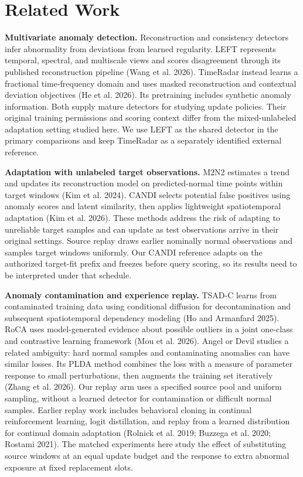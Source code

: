 \documentclass[
  american,
]{article}
\begin{document}
\section{Related Work}\label{related-work}

\textbf{Multivariate anomaly detection.} Reconstruction and consistency
detectors infer abnormality from deviations from learned regularity.
LEFT represents temporal, spectral, and multiscale views and scores
disagreement through its published reconstruction pipeline (Wang et al.
2026). TimeRadar instead learns a fractional time-frequency domain and
uses masked reconstruction and contextual deviation objectives (He et
al. 2026). Its pretraining includes synthetic anomaly information. Both
supply mature detectors for studying update policies. Their original
training permissions and scoring context differ from the mixed-unlabeled
adaptation setting studied here. We use LEFT as the shared detector in
the primary comparisons and keep TimeRadar as a separately identified
external reference.

\textbf{Adaptation with unlabeled target observations.} M2N2 estimates a
trend and updates its reconstruction model on predicted-normal time
points within target windows (Kim et al. 2024). CANDI selects potential
false positives using anomaly scores and latent similarity, then applies
lightweight spatiotemporal adaptation (Kim et al. 2026). These methods
address the risk of adapting to unreliable target samples and can update
as test observations arrive in their original settings. Source replay
draws earlier nominally normal observations and samples target windows
uniformly. Our CANDI reference adapts on the authorized target-fit
prefix and freezes before query scoring, so its results need to be
interpreted under that schedule.

\textbf{Anomaly contamination and experience replay.} TSAD-C learns from
contaminated training data using conditional diffusion for
decontamination and subsequent spatiotemporal dependency modeling (Ho
and Armanfard 2025). RoCA uses model-generated evidence about possible
outliers in a joint one-class and contrastive learning framework (Mou et
al. 2026). Angel or Devil studies a related ambiguity: hard normal
samples and contaminating anomalies can have similar losses. Its PLDA
method combines the loss with a measure of parameter response to small
perturbations, then augments the training set iteratively (Zhang et al.
2026). Our replay arm uses a specified source pool and uniform sampling,
without a learned detector for contamination or difficult normal
samples. Earlier replay work includes behavioral cloning in continual
reinforcement learning, logit distillation, and replay from a learned
distribution for continual domain adaptation (Rolnick et al. 2019;
Buzzega et al. 2020; Rostami 2021). The matched experiments here study
the effect of substituting source windows at an equal update budget and
the response to extra abnormal exposure at fixed replacement slots.
\end{document}
